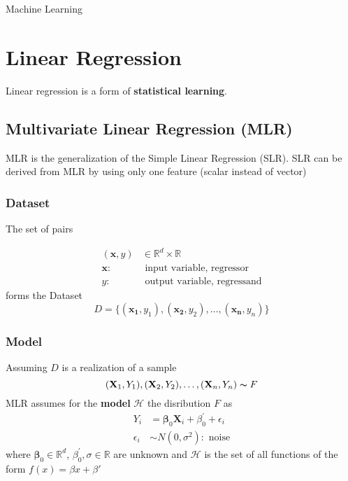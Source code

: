 \begin{center}
    \null{}
    \huge{Machine Learning\vspace*{0.4cm}\par}
\end{center}

\section{Linear Regression}
Linear regression is a form of \textbf{statistical learning}.

\subsection{Multivariate Linear Regression (MLR)}
MLR is the generalization of the Simple Linear Regression (SLR). SLR can be derived from MLR by using only one feature (scalar instead of vector)
\subsubsection{Dataset}
The set of pairs

\noindent\begin{align*}
    (\mathbf{x},y) & \in\mathbb{R}^d\times\mathbb{R}     \\
    \mathbf{x}:    & \text{ input variable, regressor}   \\
    y:             & \text{ output variable, regressand}
\end{align*}
forms the Dataset
\begin{equation*}
    D=\{(\mathbf{x_1},y_1),(\mathbf{x_2},y_2),\dots,(\mathbf{x_n},y_n)\}
\end{equation*}

\subsubsection{Model}
Assuming $D$ is a realization of a sample
\begin{equation*}
    (\mathbf{X}_1,Y_1),(\mathbf{X}_2,Y_2),\dots,(\mathbf{X}_n,Y_n)\thicksim F
\end{equation*}
MLR assumes for the \textbf{model} $\mathcal{H}$ the disribution $F$ as
\begin{align*}
    Y_i        & =\boldsymbol{\beta}_0\mathbf{X}_i+\beta^{\prime}_0+\epsilon_i \\
    \epsilon_i & \sim N(0,\sigma^2): \text{ noise}
\end{align*}
where $\boldsymbol{\beta}_0\in \mathbb{R}^d$, $\beta^{\prime}_0,\sigma \in \mathbb{R}$ are unknown and $\mathcal{H}$ is the set of all functions of the form $f(x) = \beta x +\beta'$

